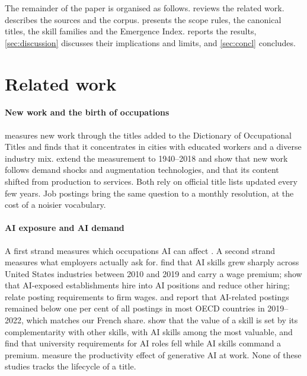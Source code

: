 \documentclass[5p,times,twocolumn,authoryear]{elsarticle}
\begin{document}
The remainder of the paper is organised as follows.  reviews the related work.  describes the sources and the corpus.  presents the scope rules, the canonical titles, the skill families and the Emergence Index.  reports the results, \cref{sec:discussion} discusses their implications and limits, and \cref{sec:concl} concludes.

\section{Related work}\label{sec:lit}
\paragraph{New work and the birth of occupations} \citet{lin2011} measures new work through the titles added to the Dictionary of Occupational Titles and finds that it concentrates in cities with educated workers and a diverse industry mix. \citet{autor2024} extend the measurement to 1940--2018 and show that new work follows demand shocks and augmentation technologies, and that its content shifted from production to services. Both rely on official title lists updated every few years. Job postings bring the same question to a monthly resolution, at the cost of a noisier vocabulary.

\paragraph{AI exposure and AI demand} A first strand measures which occupations AI can affect \citep{frey2017,felten2021,eloundou2024,gmyrek2023}. A second strand measures what employers actually ask for. \citet{alekseeva2021} find that AI skills grew sharply across United States industries between 2010 and 2019 and carry a wage premium; \citet{acemoglu2022} show that AI-exposed establishments hire into AI positions and reduce other hiring; \citet{deming2018} relate posting requirements to firm wages. \citet{squicciarini2021} and \citet{borgonovi2023} report that AI-related postings remained below one per cent of all postings in most OECD countries in 2019--2022, which matches our French share. \citet{stephany2024} show that the value of a skill is set by its complementarity with other skills, with AI skills among the most valuable, and \citet{bone2025} find that university requirements for AI roles fell while AI skills command a premium. \citet{brynjolfsson2025} measure the productivity effect of generative AI at work. None of these studies tracks the lifecycle of a title.
\end{document}
